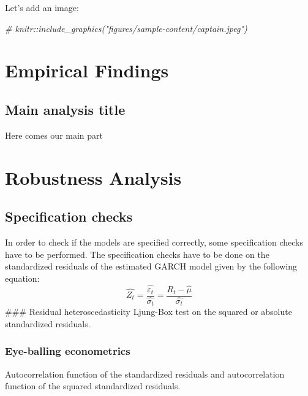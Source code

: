 \documentclass[a4paper, twoside]{templates/ociamthesis}
\newenvironment{Shaded}{\begin{snugshade}}{\end{snugshade}}
\newcommand{\CommentTok}[1]{\textcolor[rgb]{0.56,0.35,0.01}{\textit{#1}}}
\renewenvironment{Shaded}
{
  \vspace{10pt}%
  \begin{snugshade}%
}{%
  \end{snugshade}%
  \vspace{8pt}%
}
\begin{document}
\clearpage

Let's add an image:

\begin{Shaded}
\begin{Highlighting}[]
\CommentTok{\# knitr::include\_graphics("figures/sample{-}content/captain.jpeg")}
\end{Highlighting}
\end{Shaded}

\hypertarget{analysis}{%
\chapter{Empirical Findings}\label{analysis}}

\minitoc 

\hypertarget{main-analysis-title}{%
\section{Main analysis title}\label{main-analysis-title}}

Here comes our main part

\hypertarget{robustness-analysis}{%
\chapter{Robustness Analysis}\label{robustness-analysis}}

\minitoc 

\hypertarget{specification-checks}{%
\section{Specification checks}\label{specification-checks}}

In order to check if the models are specified correctly, some specification checks have to be performed. The specification checks have to be done on the standardized residuals of the estimated GARCH model given by the following equation:
\[ 
\hat{Z_t} = \dfrac{\hat{\varepsilon_t}}{\hat{\sigma_t}} = \dfrac{R_t - \hat{\mu}}{\hat{\sigma_t}}
\]
\#\#\# Residual heteroscedasticity
Ljung-Box test on the squared or absolute standardized residuals.

\hypertarget{eye-balling-econometrics}{%
\subsection{Eye-balling econometrics}\label{eye-balling-econometrics}}

Autocorrelation function of the standardized residuals and autocorrelation function of the squared standardized residuals.
\end{document}
